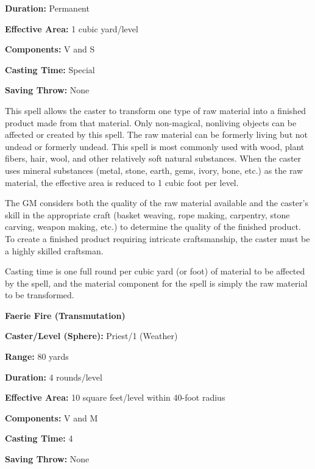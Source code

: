 \begin{multicols}{2}
\begin{minipage}{\columnwidth}
\noindent \textbf{Duration:} Permanent

\noindent \textbf{Effective Area:} 1 cubic yard/level

\noindent \textbf{Components:} V and S

\noindent \textbf{Casting Time:} Special

\noindent \textbf{Saving Throw:} None

\end{minipage}

This spell allows the caster to transform one type of raw material into a finished product made from that material.  Only non-magical, nonliving objects can be affected or created by this spell.  The raw material can be formerly living but not undead or formerly undead.  This spell is most commonly used with wood, plant fibers, hair, wool, and other relatively soft natural substances.  When the caster uses mineral substances (metal, stone, earth, gems, ivory, bone, etc.) as the raw material, the effective area is reduced to 1 cubic foot per level.

The GM considers both the quality of the raw material available and the caster's skill in the appropriate craft (basket weaving, rope making, carpentry, stone carving, weapon making, etc.) to determine the quality of the finished product.  To create a finished product requiring intricate craftsmanship, the caster must be a highly skilled craftsman.

Casting time is one full round per cubic yard (or foot) of material to be affected by the spell, and the material component for the spell is simply the raw material to be transformed.
 
\vspace{1em}

\noindent
\begin{minipage}{\columnwidth}

\noindent \textbf{Faerie Fire (Transmutation)}

\noindent \textbf{Caster/Level (Sphere):} Priest/1 (Weather)

\noindent \textbf{Range:} 80 yards

\noindent \textbf{Duration:} 4 rounds/level

\noindent \textbf{Effective Area:} 10 square feet/level within 40-foot radius

\noindent \textbf{Components:} V and M

\noindent \textbf{Casting Time:} 4

\noindent \textbf{Saving Throw:} None


\end{minipage}
\end{multicols}
